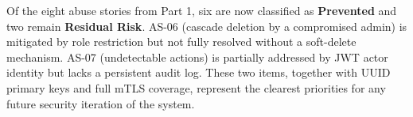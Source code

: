 \documentclass[12pt,a4paper]{report}
\begin{document}
Of the eight abuse stories from Part 1, six are now classified as \textbf{Prevented} and two
remain \textbf{Residual Risk}. AS-06 (cascade deletion by a compromised admin) is mitigated by
role restriction but not fully resolved without a soft-delete mechanism. AS-07 (undetectable
actions) is partially addressed by JWT actor identity but lacks a persistent audit log. These
two items, together with UUID primary keys and full mTLS coverage, represent the clearest
priorities for any future security iteration of the system.
\end{document}
